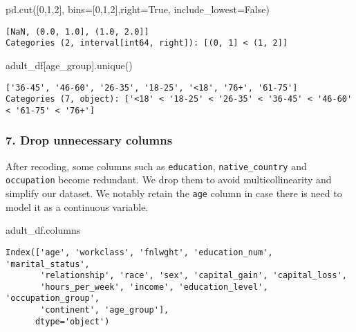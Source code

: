 \documentclass[
  letterpaper,
  DIV=11,
  numbers=noendperiod]{scrartcl}
\newenvironment{Shaded}{\begin{snugshade}}{\end{snugshade}}
\newcommand{\DecValTok}[1]{\textcolor[rgb]{0.68,0.00,0.00}{#1}}
\newcommand{\NormalTok}[1]{\textcolor[rgb]{0.00,0.23,0.31}{#1}}
\newcommand{\OperatorTok}[1]{\textcolor[rgb]{0.37,0.37,0.37}{#1}}
\newcommand{\StringTok}[1]{\textcolor[rgb]{0.13,0.47,0.30}{#1}}
\newcommand{\VariableTok}[1]{\textcolor[rgb]{0.07,0.07,0.07}{#1}}
\begin{document}
\begin{Shaded}
\begin{Highlighting}[]
\NormalTok{pd.cut([}\DecValTok{0}\NormalTok{,}\DecValTok{1}\NormalTok{,}\DecValTok{2}\NormalTok{], bins}\OperatorTok{=}\NormalTok{[}\DecValTok{0}\NormalTok{,}\DecValTok{1}\NormalTok{,}\DecValTok{2}\NormalTok{],right}\OperatorTok{=}\VariableTok{True}\NormalTok{, include\_lowest}\OperatorTok{=}\VariableTok{False}\NormalTok{)}
\end{Highlighting}
\end{Shaded}

\begin{verbatim}
[NaN, (0.0, 1.0], (1.0, 2.0]]
Categories (2, interval[int64, right]): [(0, 1] < (1, 2]]
\end{verbatim}

\begin{Shaded}
\begin{Highlighting}[]
\NormalTok{adult\_df[}\StringTok{\textquotesingle{}age\_group\textquotesingle{}}\NormalTok{].unique()}
\end{Highlighting}
\end{Shaded}

\begin{verbatim}
['36-45', '46-60', '26-35', '18-25', '<18', '76+', '61-75']
Categories (7, object): ['<18' < '18-25' < '26-35' < '36-45' < '46-60' < '61-75' < '76+']
\end{verbatim}

\subsubsection{7. Drop unnecessary
columns}\label{drop-unnecessary-columns}

After recoding, some columns such as \texttt{education},
\texttt{native\_country} and \texttt{occupation} become redundant. We
drop them to avoid multicollinearity and simplify our dataset. We
notably retain the \texttt{age} column in case there is need to model it
as a continuous variable.

\begin{Shaded}
\begin{Highlighting}[]
\NormalTok{adult\_df.columns}
\end{Highlighting}
\end{Shaded}

\begin{verbatim}
Index(['age', 'workclass', 'fnlwght', 'education_num', 'marital_status',
       'relationship', 'race', 'sex', 'capital_gain', 'capital_loss',
       'hours_per_week', 'income', 'education_level', 'occupation_group',
       'continent', 'age_group'],
      dtype='object')
\end{verbatim}
\end{document}
